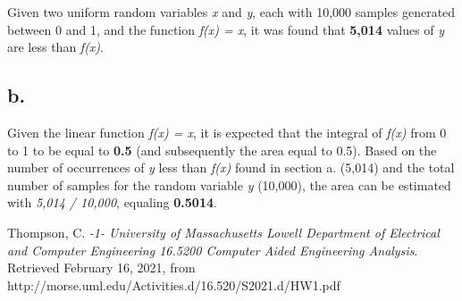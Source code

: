 \documentclass{report}
\begin{document}
	Given two uniform random variables \textit{x} and \textit{y}, each with 10,000 samples generated between 0 and 1, and the function \textit{f(x) = x}, it was found that \textbf{5,014} values of \textit{y} are less than \textit{f(x)}.
	
	\subsection*{b.}
	
	Given the linear function \textit{f(x) = x}, it is expected that the integral of \textit{f(x)} from 0 to 1 to be equal to \textbf{0.5} (and subsequently the area equal to 0.5). Based on the number of occurrences of \textit{y} less than \textit{f(x)} found in section a. (5,014) and the total number of samples for the random variable \textit{y} (10,000), the area can be estimated with \textit{5,014 / 10,000}, equaling \textbf{0.5014}.

	\begin{thebibliography}{99\kern\bibindent}
	
	Thompson, C.
	\textit{-1- University of Massachusetts Lowell Department of Electrical and Computer Engineering 16.5200 Computer Aided Engineering Analysis}. Retrieved February 16, 2021, from http://morse.uml.edu/Activities.d/16.520/S2021.d/HW1.pdf
	
	\end{thebibliography}
\end{document}
